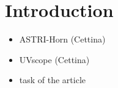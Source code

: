 \section{Introduction}
\label{sect:intro}



\begin{itemize}
\item
ASTRI-Horn (Cettina)
\item
UVscope (Cettina)
\item
task of the article 
\end{itemize}
